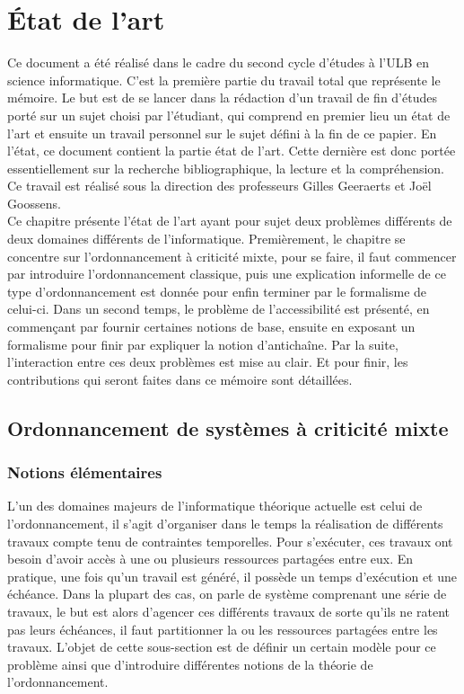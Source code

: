 \documentclass[a4paper]{report}
\theoremstyle{break}
\theoremstyle{breakplain}
\begin{document}
\tableofcontents
\chapter{État de l'art}
Ce document a été réalisé dans le cadre du second cycle d'études à l'ULB en science informatique. C'est la première partie du travail total que représente le mémoire. Le but est de se lancer dans la rédaction d'un travail de fin d'études porté sur un sujet choisi par l'étudiant, qui comprend en premier lieu un état de l'art et ensuite un travail personnel sur le sujet défini à la fin de ce papier. En l'état, ce document contient la partie état de l'art. Cette dernière est donc portée essentiellement sur la recherche bibliographique, la lecture et la compréhension. Ce travail est réalisé sous la direction des professeurs Gilles Geeraerts et Joël Goossens.\\

Ce chapitre présente l'état de l'art ayant pour sujet deux problèmes différents de deux domaines différents de l'informatique. Premièrement, le chapitre se concentre sur l'ordonnancement à criticité mixte, pour se faire, il faut commencer par introduire l'ordonnancement classique, puis une explication informelle de ce type d'ordonnancement est donnée pour enfin terminer par le formalisme de celui-ci. Dans un second temps, le problème de l'accessibilité est présenté, en commençant par fournir certaines notions de base, ensuite en exposant un formalisme pour finir par expliquer la notion d'antichaîne. Par la suite, l'interaction entre ces deux problèmes est mise au clair. Et pour finir, les contributions qui seront faites dans ce mémoire sont détaillées.

\section{Ordonnancement de systèmes à criticité mixte}
\subsection{Notions élémentaires}
L'un des domaines majeurs de l'informatique théorique actuelle est celui de l'ordonnancement, il s'agit d'organiser dans le temps la réalisation de différents travaux compte tenu de contraintes temporelles. Pour s'exécuter, ces travaux ont besoin d'avoir accès à une ou plusieurs ressources partagées entre eux. En pratique, une fois qu'un travail est généré, il possède un temps d'exécution et une échéance. Dans la plupart des cas, on parle de système comprenant une série de travaux, le but est alors d'agencer ces différents travaux de sorte qu'ils ne ratent pas leurs échéances, il faut partitionner la ou les ressources partagées entre les travaux. L'objet de cette sous-section est de définir un certain modèle pour ce problème ainsi que d'introduire différentes notions de la théorie de l'ordonnancement.
\end{document}
